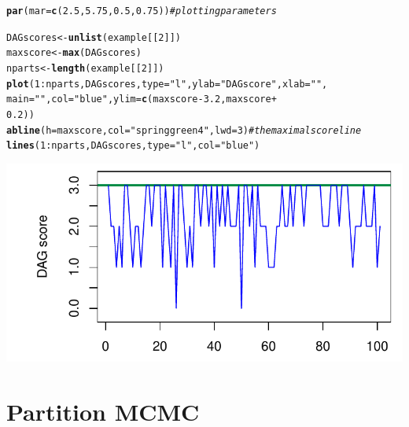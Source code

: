 \documentclass[a4paper]{article}\usepackage[]{graphicx}\usepackage[]{color}
\makeatletter
\def\maxwidth{ %
  \ifdim\Gin@nat@width>\linewidth
    \linewidth
  \else
    \Gin@nat@width
  \fi
}
\newcommand{\hlnum}[1]{\textcolor[rgb]{0.686,0.059,0.569}{#1}}%
\newcommand{\hlstr}[1]{\textcolor[rgb]{0.192,0.494,0.8}{#1}}%
\newcommand{\hlcom}[1]{\textcolor[rgb]{0.678,0.584,0.686}{\textit{#1}}}%
\newcommand{\hlopt}[1]{\textcolor[rgb]{0,0,0}{#1}}%
\newcommand{\hlstd}[1]{\textcolor[rgb]{0.345,0.345,0.345}{#1}}%
\newcommand{\hlkwb}[1]{\textcolor[rgb]{0.69,0.353,0.396}{#1}}%
\newcommand{\hlkwc}[1]{\textcolor[rgb]{0.333,0.667,0.333}{#1}}%
\newcommand{\hlkwd}[1]{\textcolor[rgb]{0.737,0.353,0.396}{\textbf{#1}}}%
\newenvironment{kframe}{%
 \def\at@end@of@kframe{}%
 \ifinner\ifhmode%
  \def\at@end@of@kframe{\end{minipage}}%
  \begin{minipage}{\columnwidth}%
 \fi\fi%
 \def\FrameCommand##1{\hskip\@totalleftmargin \hskip-\fboxsep
 \colorbox{shadecolor}{##1}\hskip-\fboxsep
     \hskip-\linewidth \hskip-\@totalleftmargin \hskip\columnwidth}%
 \MakeFramed {\advance\hsize-\width
   \@totalleftmargin\z@ \linewidth\hsize
   \@setminipage}}%
 {\par\unskip\endMakeFramed%
 \at@end@of@kframe}
\newenvironment{knitrout}{}{} %
\makeatother
\begin{document}
\begin{knitrout}
\color{fgcolor}\begin{kframe}
\begin{alltt}
\hlkwd{par}\hlstd{(}\hlkwc{mar} \hlstd{=} \hlkwd{c}\hlstd{(}\hlnum{2.5}\hlstd{,} \hlnum{5.75}\hlstd{,} \hlnum{0.5}\hlstd{,} \hlnum{0.75}\hlstd{))}  \hlcom{# plotting parameters}

\hlstd{DAGscores} \hlkwb{<-} \hlkwd{unlist}\hlstd{(example[[}\hlnum{2}\hlstd{]])}
\hlstd{maxscore} \hlkwb{<-} \hlkwd{max}\hlstd{(DAGscores)}
\hlstd{nparts} \hlkwb{<-} \hlkwd{length}\hlstd{(example[[}\hlnum{2}\hlstd{]])}
\hlkwd{plot}\hlstd{(}\hlnum{1}\hlopt{:}\hlstd{nparts, DAGscores,} \hlkwc{type} \hlstd{=} \hlstr{"l"}\hlstd{,} \hlkwc{ylab} \hlstd{=} \hlstr{"DAG score"}\hlstd{,} \hlkwc{xlab} \hlstd{=} \hlstr{""}\hlstd{,}
    \hlkwc{main} \hlstd{=} \hlstr{""}\hlstd{,} \hlkwc{col} \hlstd{=} \hlstr{"blue"}\hlstd{,} \hlkwc{ylim} \hlstd{=} \hlkwd{c}\hlstd{(maxscore} \hlopt{-} \hlnum{3.2}\hlstd{, maxscore} \hlopt{+}
        \hlnum{0.2}\hlstd{))}
\hlkwd{abline}\hlstd{(}\hlkwc{h} \hlstd{= maxscore,} \hlkwc{col} \hlstd{=} \hlstr{"springgreen4"}\hlstd{,} \hlkwc{lwd} \hlstd{=} \hlnum{3}\hlstd{)}  \hlcom{# the maximal score line}
\hlkwd{lines}\hlstd{(}\hlnum{1}\hlopt{:}\hlstd{nparts, DAGscores,} \hlkwc{type} \hlstd{=} \hlstr{"l"}\hlstd{,} \hlkwc{col} \hlstd{=} \hlstr{"blue"}\hlstd{)}
\end{alltt}
\end{kframe}

{\centering \includegraphics[width=\maxwidth]{figure/minimal-unnamed-chunk-17-1} 

}



\end{knitrout}

\section{Partition MCMC}
\end{document}

